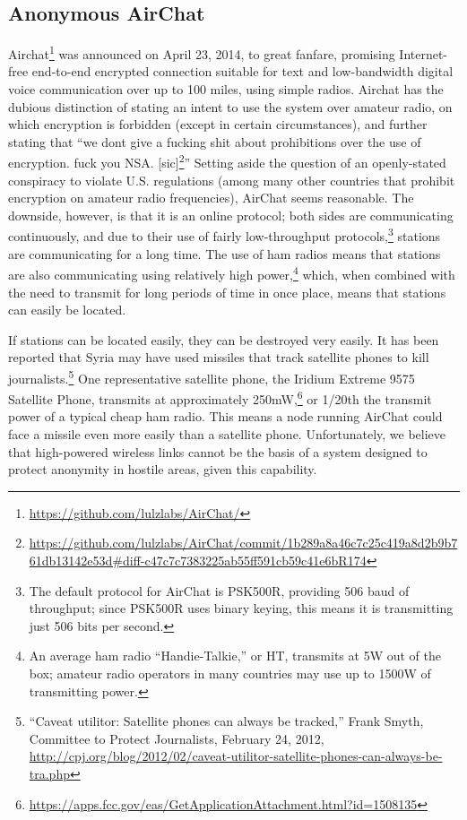 \documentclass[12pt]{article}
\begin{document}
  \subsection{Anonymous AirChat}
  \label{subsec:airchat}
  
  Airchat\footnote{\url{https://github.com/lulzlabs/AirChat/}} was announced on April 23, 2014, to great fanfare, promising Internet-free end-to-end encrypted connection suitable for text and low-bandwidth digital voice communication over up to 100 miles, using simple radios. Airchat has the dubious distinction of stating an intent to use the system over amateur radio, on which encryption is forbidden (except in certain circumstances), and further stating that ``we dont give a fucking shit about prohibitions over the use of encryption. fuck you NSA. [sic]\footnote{\url{https://github.com/lulzlabs/AirChat/commit/1b289a8a46c7c25c419a8d2b9b761db13142e53d\#diff-c47c7c7383225ab55ff591cb59c41e6bR174}}'' Setting aside the question of an openly-stated conspiracy to violate U.S. regulations (among many other countries that prohibit encryption on amateur radio frequencies), AirChat seems reasonable. The downside, however, is that it is an online protocol; both sides are communicating continuously, and due to their use of fairly low-throughput protocols,\footnote{The default protocol for AirChat is PSK500R, providing 506 baud of throughput; since PSK500R uses binary keying, this means it is transmitting just 506 bits per second.} stations are communicating for a long time. The use of ham radios means that stations are also communicating using relatively high power,\footnote{An average ham radio ``Handie-Talkie,'' or HT, transmits at 5W out of the box; amateur radio operators in many countries may use up to 1500W of transmitting power.} which, when combined with the need to transmit for long periods of time in once place, means that stations can easily be located.
  
  If stations can be located easily, they can be destroyed very easily. It has been reported that Syria may have used missiles that track satellite phones to kill journalists.\footnote{``Caveat utilitor: Satellite phones can always be tracked,'' Frank Smyth, Committee to Protect Journalists, February 24, 2012, \url{http://cpj.org/blog/2012/02/caveat-utilitor-satellite-phones-can-always-be-tra.php}} One representative satellite phone, the Iridium Extreme 9575 Satellite Phone, transmits at approximately 250mW,\footnote{\url{https://apps.fcc.gov/eas/GetApplicationAttachment.html?id=1508135}} or 1/20th the transmit power of a typical cheap ham radio. This means a node running AirChat could face a missile even more easily than a satellite phone. Unfortunately, we believe that high-powered wireless links cannot be the basis of a system designed to protect anonymity in hostile areas, given this capability.
  
\end{document}
